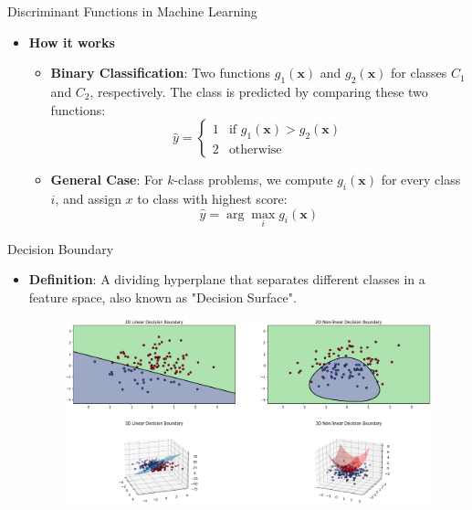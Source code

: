 \documentclass[serif, aspectratio=169]{beamer}
\begin{document}
\begin{frame}{Discriminant Functions in Machine Learning}
    \begin{itemize}
        \item \textbf{How it works}
        \medskip
        \begin{itemize}\itemsep1.5em
            \item \justifying \textbf{Binary Classification}: Two functions \textbf{$g_1(\mathbf{x})$} and \textbf{$g_2(\mathbf{x})$} for classes $C_1$ and $C_2$, respectively. The class is predicted by comparing these two functions:
            \[
                \hat{y} =
                \begin{cases} 
                    1 & \text{if } g_1(\mathbf{x}) > g_2(\mathbf{x}) \\
                    2 & \text{otherwise}
                \end{cases}
            \]

            \item \justifying \textbf{General Case}: For $k$-class problems, we compute \textbf{$g_i(\mathbf{x})$} for every class $i$, and assign \textbf{$x$} to class with highest score:
            $$
                \hat{y} = \arg \max_i g_i(\mathbf{x})
            $$
        \end{itemize}
    \end{itemize}
\end{frame}

\begin{frame}{Decision Boundary}
    \begin{itemize}
        \item \justifying \textbf{Definition}: A dividing hyperplane that separates different classes in a feature space, also known as "Decision Surface".
        \medskip
        \begin{figure}
            \centering
            \includegraphics[width=.85\linewidth]{pic/Figure_24.png}
        \end{figure}
    \end{itemize}
\end{frame}
\end{document}
